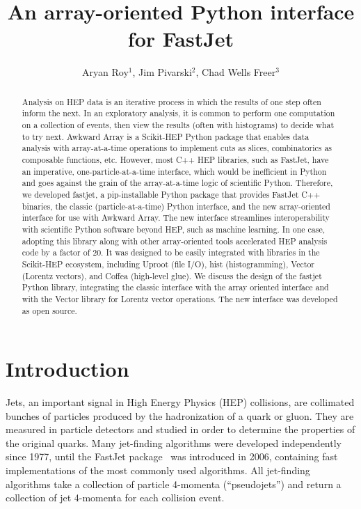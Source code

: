 \documentclass[a4paper]{jpconf}
\begin{document}
\title{An array-oriented Python interface for FastJet}

\author{Aryan Roy$^1$, Jim Pivarski$^2$, Chad Wells Freer$^3$}

\address{1 Manipal Institute of Technology, Manipal, India}
\address{2 Princeton University, Princeton NJ, USA}
\address{3 Massachusetts Institute of Technology, Boston MA, USA}

\begin{abstract}
Analysis on HEP data is an iterative process in which the results of one step often inform the next. In an
exploratory analysis, it is common to perform one computation on a collection of events, then view the results
(often with histograms) to decide what to try next. Awkward Array is a Scikit-HEP Python package that
enables data analysis with array-at-a-time operations to implement cuts as slices, combinatorics as composable
functions, etc. However, most C++ HEP libraries, such as FastJet, have an imperative, one-particle-at-a-time
interface, which would be inefficient in Python and goes against the grain of the array-at-a-time logic of
scientific Python. Therefore, we developed fastjet, a pip-installable Python package that provides FastJet C++
binaries, the classic (particle-at-a-time) Python interface, and the new array-oriented interface for use with
Awkward Array.
The new interface streamlines interoperability with scientific Python software beyond HEP, such as machine
learning. In one case, adopting this library along with other array-oriented tools accelerated HEP analysis
code by a factor of 20. It was designed to be easily integrated with libraries in the Scikit-HEP ecosystem,
including Uproot (file I/O), hist (histogramming), Vector (Lorentz vectors), and Coffea (high-level glue). We discuss the design of the fastjet Python library, integrating the classic interface with the array oriented interface and with the Vector library for Lorentz vector operations. The new interface was developed as open source.
\end{abstract}

\section{Introduction}

Jets, an important signal in High Energy Physics (HEP) collisions, are collimated bunches of particles produced by the hadronization of a quark or gluon. They are measured in particle detectors and studied in order to determine the properties of the original quarks. Many jet-finding algorithms were developed independently since 1977, until the FastJet package~\cite{cacciari2012fastjet} was introduced in 2006, containing fast implementations of the most commonly used algorithms. All jet-finding algorithms take a collection of particle 4-momenta (``pseudojets'') and return a collection of jet 4-momenta for each collision event.
\end{document}
